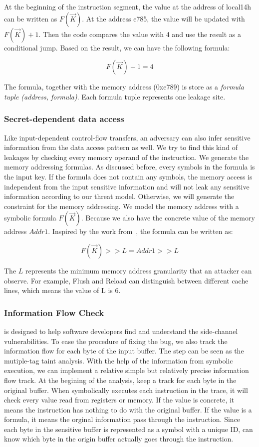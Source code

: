 At the beginning of the instruction segment, the value at the 
address of local14h can be written as $F(\vec{K})$. At the address e785, 
the value will be updated with $F(\vec{K})+1$. Then the code compares 
the value with 4 and use the result as a conditional jump. 
Based on the result, we can have the following formula:

$$F(\vec{K}) + 1 = 4$$

The formula, together with the memory address (0xe789) is store
as a \textit{formula tuple (address, formula)}. 
Each formula tuple represents one leakage site.

\subsubsection{Secret-dependent data access}
Like input-dependent control-flow transfers, an adversary can also infer 
sensitive information from the data access pattern as well. 
We try to find this kind of leakages by checking 
every memory operand of the instruction. We generate the memory addressing 
formulas. As discussed before, every symbols in the formula is the input key. 
If the formula does not contain any symbols, the memory access is independent 
from the input sensitive information and will not leak any sensitive information 
according to our threat model. Otherwise, we will generate the constraint for
the memory addressing. We model the memory address with a symbolic formula 
$F(\vec{K})$. 
Because we also have the concrete value of the memory address $Addr1$. 
Inspired by the work from~\cite{203878}, the formula can be written as:

$$F(\vec{K}) >> L = Addr1 >> L$$

The $L$ represents the minimum memory address granularity that an attacker 
can observe. For example, Flush and Reload can distinguish between different
cache lines, which means the value of L is 6.

\subsubsection{Information Flow Check}
\tool{} is designed to help software developers find and understand the 
side-channel vulnerabilities. To ease the procedure of fixing the bug,
we also track the information flow for each byte of the input
buffer. 
The step can be seen as the mutiple-tag taint analysis.
With the help of the information from symbolic execution, we can implement
a relative simple but relatively precise information flow track.
At the begining of the analysis, \tool{} keep a track for each byte 
in the original buffer. When \tool{} symbolically executes each
instruction in the trace, it will check every value read from
registers or memory. If the value is concrete, it means the
instruction has nothing to do with the original buffer.
If the value is a formula, it means the orginal information
pass through the instruction. Since each byte in the sensitive
buffer is represented as a symbol with a unique ID, \tool{} can
know which byte in the origin buffer actually goes through the
instruction.


